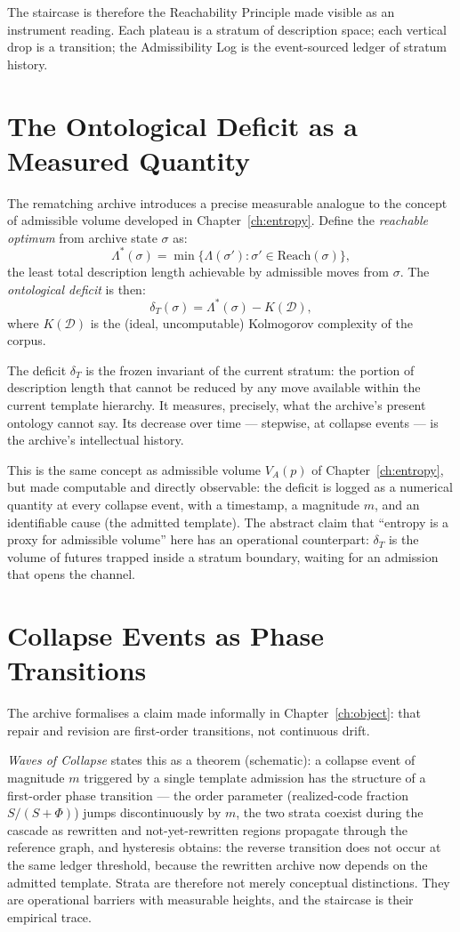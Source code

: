 \documentclass[11pt, a4paper, openany]{book}
\theoremstyle{plain}
\theoremstyle{definition}
\theoremstyle{remark}
\begin{document}
The staircase is therefore the Reachability Principle made visible as an instrument reading.
Each plateau is a stratum of description space; each vertical drop is a transition;
the Admissibility Log is the event-sourced ledger of stratum history.

\section{The Ontological Deficit as a Measured Quantity}

The rematching archive introduces a precise measurable analogue to the concept
of admissible volume developed in Chapter~\ref{ch:entropy}.
Define the \emph{reachable optimum} from archive state $\sigma$ as:
\[
  \Lambda^*(\sigma) = \min\bigl\{\Lambda(\sigma') : \sigma' \in \mathrm{Reach}(\sigma)\bigr\},
\]
the least total description length achievable by admissible moves from $\sigma$.
The \emph{ontological deficit} is then:
\[
  \delta_T(\sigma) = \Lambda^*(\sigma) - K(\mathcal{D}),
\]
where $K(\mathcal{D})$ is the (ideal, uncomputable) Kolmogorov complexity of the corpus.

The deficit $\delta_T$ is the frozen invariant of the current stratum:
the portion of description length that cannot be reduced by any move available
within the current template hierarchy.
It measures, precisely, what the archive's present ontology cannot say.
Its decrease over time --- stepwise, at collapse events --- is the archive's
intellectual history.

This is the same concept as admissible volume $V_A(p)$ of Chapter~\ref{ch:entropy},
but made computable and directly observable: the deficit is logged as a numerical
quantity at every collapse event, with a timestamp, a magnitude $m$, and an
identifiable cause (the admitted template).
The abstract claim that ``entropy is a proxy for admissible volume'' here has
an operational counterpart: $\delta_T$ is the volume of futures trapped inside
a stratum boundary, waiting for an admission that opens the channel.

\section{Collapse Events as Phase Transitions}

The archive formalises a claim made informally in Chapter~\ref{ch:object}:
that repair and revision are first-order transitions, not continuous drift.

\emph{Waves of Collapse} states this as a theorem (schematic):
a collapse event of magnitude $m$ triggered by a single template admission
has the structure of a first-order phase transition --- the order parameter
(realized-code fraction $S/(S + \Phi)$) jumps discontinuously by $m$,
the two strata coexist during the cascade as rewritten and not-yet-rewritten
regions propagate through the reference graph, and hysteresis obtains:
the reverse transition does not occur at the same ledger threshold,
because the rewritten archive now depends on the admitted template.
Strata are therefore not merely conceptual distinctions.
They are operational barriers with measurable heights, and the staircase
is their empirical trace.
\end{document}
